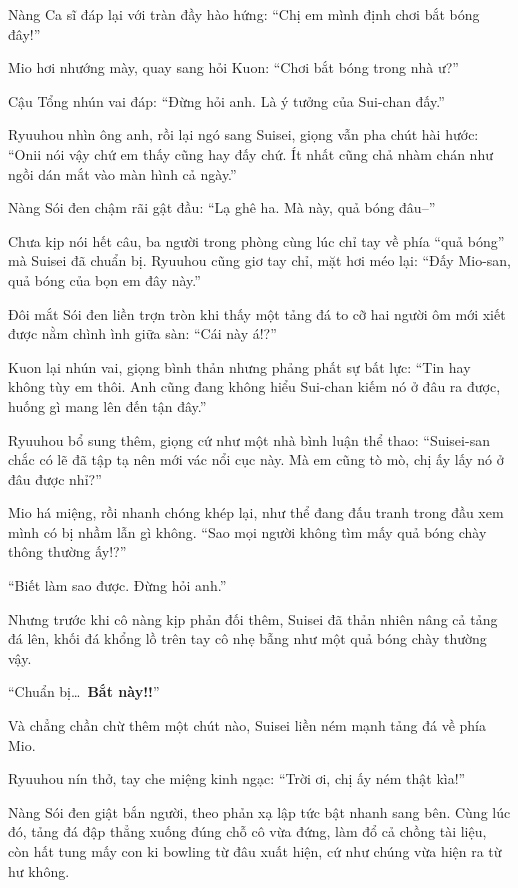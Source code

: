 \documentclass[../main.tex]{subfiles}
\begin{document}
Nàng Ca sĩ đáp lại với tràn đầy hào hứng: ``Chị em mình định chơi bắt bóng đây!''


Mio hơi nhướng mày, quay sang hỏi Kuon: ``Chơi bắt bóng trong nhà ư?''

Cậu Tổng nhún vai đáp: ``Đừng hỏi anh. Là ý tưởng của Sui-chan đấy.''

Ryuuhou nhìn ông anh, rồi lại ngó sang Suisei, giọng vẫn pha chút hài hước: ``Onii nói vậy chứ em thấy cũng hay đấy chứ. Ít nhất cũng chả nhàm chán như ngồi dán mắt vào màn hình cả ngày.''

Nàng Sói đen chậm rãi gật đầu: ``Lạ ghê ha. Mà này, quả bóng đâu--''

Chưa kịp nói hết câu, ba người trong phòng cùng lúc chỉ tay về phía ``quả bóng'' mà Suisei đã chuẩn bị. Ryuuhou cũng giơ tay chỉ, mặt hơi méo lại: ``Đấy Mio-san, quả bóng của bọn em đây này.''

Đôi mắt Sói đen liền trợn tròn khi thấy một tảng đá to cỡ hai người ôm mới xiết được nằm chình ình giữa sàn: ``Cái này á!?''

Kuon lại nhún vai, giọng bình thản nhưng phảng phất sự bất lực: ``Tin hay không tùy em thôi. Anh cũng đang không hiểu Sui-chan kiếm nó ở đâu ra được, huống gì mang lên đến tận đây.''

Ryuuhou bổ sung thêm, giọng cứ như một nhà bình luận thể thao: ``Suisei-san chắc có lẽ đã tập tạ nên mới vác nổi cục này. Mà em cũng tò mò, chị ấy lấy nó ở đâu được nhỉ?''

Mio há miệng, rồi nhanh chóng khép lại, như thể đang đấu tranh trong đầu xem mình có bị nhầm lẫn gì không. ``Sao mọi người không tìm mấy quả bóng chày thông thường ấy!?''

``Biết làm sao được. Đừng hỏi anh.''

Nhưng trước khi cô nàng kịp phản đối thêm, Suisei đã thản nhiên nâng cả tảng đá lên, khối đá khổng lồ trên tay cô nhẹ bẫng như một quả bóng chày thường vậy.

``Chuẩn bị\dots\ \textbf{Bắt này!!}''

Và chẳng chần chừ thêm một chút nào, Suisei liền ném mạnh tảng đá về phía Mio.


Ryuuhou nín thở, tay che miệng kinh ngạc: ``Trời ơi, chị ấy ném thật kìa!''

Nàng Sói đen giật bắn người, theo phản xạ lập tức bật nhanh sang bên. Cùng lúc đó, tảng đá đập thẳng xuống đúng chỗ cô vừa đứng, làm đổ cả chồng tài liệu, còn hất tung mấy con ki bowling từ đâu xuất hiện, cứ như chúng vừa hiện ra từ hư không.
\end{document}
